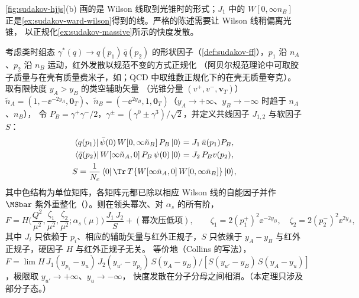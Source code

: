 \cref{fig:sudakov-hjjs}(b) 画的是 Wilson 线取到光锥时的形式；$J_1$ 中的 $W[0,\infty n_B]$ 正是\cref{ex:sudakov-ward-wilson}得到的线。严格的陈述需要让 Wilson 线稍偏离光锥，
以正规化\cref{ex:sudakov-massive}所示的快度发散。

\begin{theorem}\label{thm:sudakov-factorization}
考虑类时组态 $\gamma^*(q)\to q(p_1)\,\bar q(p_2)$ 的形状因子（\cref{def:sudakov-ff}），$p_1$ 沿 $n_A$、$p_2$ 沿 $n_B$ 运动，红外发散以规范不变的方式正规化
（阿贝尔规范理论中可取胶子质量与在壳有质量费米子，如\cite[第~10~章]{Collins2011}；QCD 中取维数正规化下的在壳无质量夸克）。取有限快度 $y_A>y_B$ 的类空辅助矢量
（光锥分量 $(v^+,v^-,\mathbf v_T)$）$\tilde n_A=(1,-\ee^{-2y_A},\mathbf 0_T)$、$\tilde n_B=(-\ee^{2y_B},1,\mathbf 0_T)$（$y_A\to+\infty$、$y_B\to-\infty$ 时趋于 $n_A$、$n_B$），
令 $P_B=\gamma^+\gamma^-/2$，$\gamma^\pm=(\gamma^0\pm\gamma^3)/\sqrt2$，并定义共线因子 $J_{1,2}$ 与软因子 $S$：
\begin{equation}\label{eq:sudakov-JS}
\begin{gathered}
\langle q(p_1)|\,\bar\psi(0)\,W[0,\infty\tilde n_B]\,P_B\,|0\rangle=J_1\,\bar u(p_1)P_B,\\
\langle\bar q(p_2)|\,W[\infty\tilde n_A,0]\,P_B\,\psi(0)\,|0\rangle=J_2\,P_Bv(p_2),\\
S=\frac1{N_c}\,\langle0|\,\Tr\,T\{W[\infty\tilde n_A,0]\,W[0,\infty\tilde n_B]\}\,|0\rangle ,
\end{gathered}
\end{equation}
其中色结构为单位矩阵，各矩阵元都已除以相应 Wilson 线的自能因子并作 $\MSbar$ 紫外重整化（\cite[式~(10.89)--(10.92)、(10.101)]{Collins2011}）。则在领头幂次、对 $\alpha_s$ 的所有阶，
\begin{equation}\label{eq:sudakov-fact}
F=H\Big(\frac{Q^2}{\mu^2},\frac{\zeta_1}{\mu^2},\frac{\zeta_2}{\mu^2};\alpha_s(\mu)\Big)\,\frac{J_1\,J_2}{S}+(\text{幂次压低项}),\qquad
\zeta_1=2(p_1^+)^2\ee^{-2y_B},\quad\zeta_2=2(p_2^-)^2\ee^{2y_A},
\end{equation}
其中 $J_i$ 只依赖于 $p_i$、相应的辅助矢量与红外正规子，$S$ 只依赖于 $y_A-y_B$ 与红外正规子，硬因子 $H$ 与红外正规子无关。
等价地（Collins 的写法），$F=\lim H\,J_1(y_{p_1}-y_{u})\,J_2(y_{u'}-y_{p_2})\,S(y_A-y_B)/[S(y_{u'}-y_B)\,S(y_A-y_u)]$，极限取 $y_{u'}\to+\infty$、$y_u\to-\infty$，
快度发散在分子分母之间相消\cite[式~(10.109)]{Collins2011}。（本定理只涉及部分子态。）
\end{theorem}

